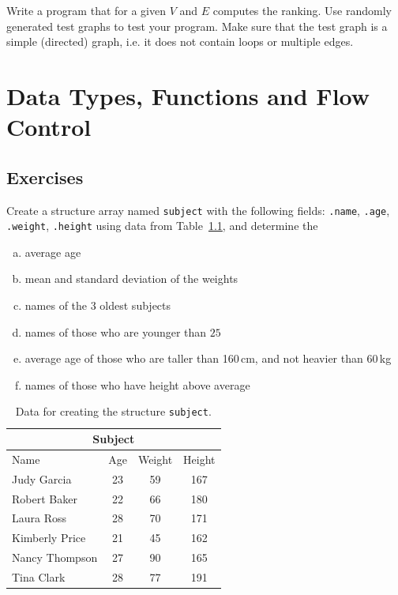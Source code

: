\documentclass[a4paper, fleqn, 10pt]{report}
\theoremstyle{definition}
\newenvironment{prb*}[1]
  {\renewcommand\theprb{\thechapter.\arabic{prb}\rlap{$^{#1}$}}\prb}
  {\endprb}
\begin{document}
Write a program that for a given $V$ and $E$ computes the ranking.
Use randomly generated test graphs to test your program.
Make sure that the test graph is a simple (directed) graph, i.e. it does not contain
loops or multiple edges.






\chapter{Data Types, Functions and Flow Control}
\section{Exercises}
\begin{prb*}{3}
Create a structure array named {\tt subject} with the following fields: {\tt .name}, {\tt.age}, {\tt.weight}, {\tt.height}
using data from Table~\ref{tab:sub}, and determine the
\begin{multicols}{2}
 \begin{enumerate}[a)]
  \item average age
  \item mean and standard deviation of the weights 
  \item names of the 3 oldest subjects
  \item names of those who are younger than $25$
  \item average age of those who are taller than 160\,cm, and not heavier than 60\,kg
  \item names of those who have height above average
 \end{enumerate}
\end{multicols}
\begin{table}[ht!]
 \centering
 \begin{tabular}{lccc}
  \toprule
  \multicolumn{4}{c}{Subject}\\
  \midrule
  Name & Age & Weight & Height\\
  \midrule
  Judy Garcia  	  & 23 & 59 & 167\\
  Robert Baker 	  & 22 & 66 & 180\\
  Laura Ross 	  & 28 & 70 & 171\\
  Kimberly Price  & 21 & 45 & 162\\
  Nancy Thompson  & 27 & 90 & 165\\
  Tina Clark 	  & 28 & 77 & 191\\
  \bottomrule
 \end{tabular}
 \caption{Data for creating the structure {\tt subject}.}\label{tab:sub}
\end{table}
\end{prb*}
\end{document}
